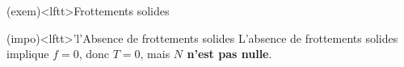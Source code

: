\documentclass[../../main/main.tex]{subfiles}
\begin{document}
\begin{tcb*}[breakable](exem)<lftt>{Frottements solides}
	\begin{center}
		\vspace{-10pt}
	\end{center}
	\tcblower
	\begin{center}
		\vspace{-20pt}
	\end{center}
	\vspace{-15pt}
\end{tcb*}

\begin{tcb}(impo)<lftt>'l'{Absence de frottements solides}
	L'absence de frottements solides implique $f=0$, donc $T = 0$, mais
	\textbf{$N$ n'est pas nulle}.
\end{tcb}

\vspace{-25pt}
\end{document}
